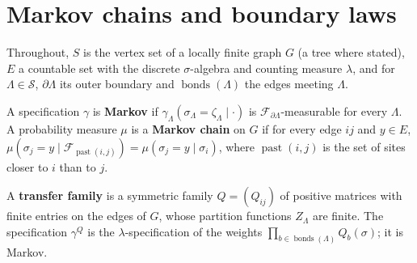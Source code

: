 \section{Markov chains and boundary laws}

Throughout, $S$ is the vertex set of a locally finite graph $G$ (a tree where stated), $E$ a
countable set with the discrete $\sigma$-algebra and counting measure $\lambda$, and for
$\Lambda \in \mathcal S$, $\partial\Lambda$ its outer boundary and $\operatorname{bonds}(\Lambda)$
the edges meeting $\Lambda$.

\begin{definition}
    \label{def:tr-markov}
    \leanok

    A specification $\gamma$ is \textbf{Markov} if $\gamma_\Lambda(\sigma_\Lambda = \zeta_\Lambda \mid \cdot)$
    is $\mathcal F_{\partial\Lambda}$-measurable for every $\Lambda$. A probability measure $\mu$ is
    a \textbf{Markov chain} on $G$ if for every edge $ij$ and $y \in E$,
    $\mu(\sigma_j = y \mid \mathcal F_{\operatorname{past}(i,j)}) = \mu(\sigma_j = y \mid \sigma_i)$,
    where $\operatorname{past}(i,j)$ is the set of sites closer to $i$ than to $j$.
\end{definition}

\begin{definition}
    \label{def:tr-transfer}
    \leanok

    A \textbf{transfer family} is a symmetric family $Q = (Q_{ij})$ of positive matrices with
    finite entries on the edges of $G$, whose partition functions $Z_\Lambda$ are finite. The
    specification $\gamma^Q$ is the $\lambda$-specification of the weights
    $\prod_{b \in \operatorname{bonds}(\Lambda)} Q_b(\sigma)$; it is Markov.
\end{definition}

